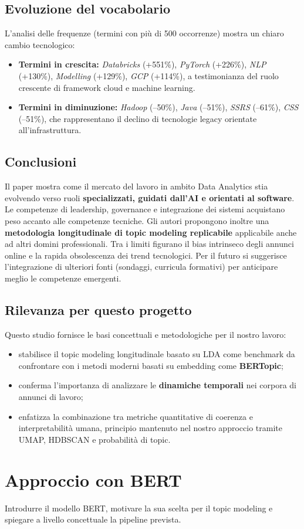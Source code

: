 \subsection{Evoluzione del vocabolario}
L'analisi delle frequenze (termini con più di 500 occorrenze) mostra un chiaro cambio tecnologico:
\begin{itemize}
    \item \textbf{Termini in crescita:} \textit{Databricks} (+551\%), \textit{PyTorch} (+226\%), \textit{NLP} (+130\%), \textit{Modelling} (+129\%), \textit{GCP} (+114\%), a testimonianza del ruolo crescente di framework cloud e machine learning.
    \item \textbf{Termini in diminuzione:} \textit{Hadoop} (--50\%), \textit{Java} (--51\%), \textit{SSRS} (--61\%), \textit{CSS} (--51\%), che rappresentano il declino di tecnologie legacy orientate all'infrastruttura.
\end{itemize}

\subsection{Conclusioni}
Il paper mostra come il mercato del lavoro in ambito Data Analytics stia evolvendo verso ruoli \textbf{specializzati, guidati dall'AI e orientati al software}.
Le competenze di leadership, governance e integrazione dei sistemi acquistano peso accanto alle competenze tecniche.
Gli autori propongono inoltre una \textbf{metodologia longitudinale di topic modeling replicabile} applicabile anche ad altri domini professionali.
Tra i limiti figurano il bias intrinseco degli annunci online e la rapida obsolescenza dei trend tecnologici.
Per il futuro si suggerisce l'integrazione di ulteriori fonti (sondaggi, curricula formativi) per anticipare meglio le competenze emergenti.

\subsection{Rilevanza per questo progetto}
Questo studio fornisce le basi concettuali e metodologiche per il nostro lavoro:
\begin{itemize}
    \item stabilisce il topic modeling longitudinale basato su LDA come benchmark da confrontare con i metodi moderni basati su embedding come \textbf{BERTopic};
    \item conferma l'importanza di analizzare le \textbf{dinamiche temporali} nei corpora di annunci di lavoro;
    \item enfatizza la combinazione tra metriche quantitative di coerenza e interpretabilità umana, principio mantenuto nel nostro approccio tramite UMAP, HDBSCAN e probabilità di topic.
\end{itemize}

\section{Approccio con BERT}
Introdurre il modello BERT, motivare la sua scelta per il topic modeling e spiegare a livello concettuale la pipeline prevista.

